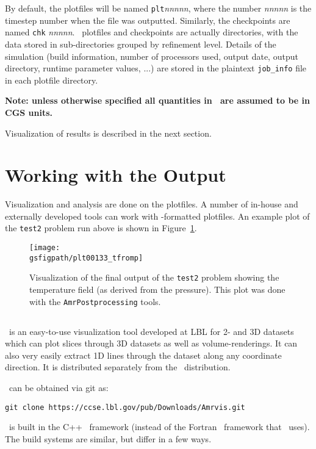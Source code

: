 \begin{enumerate}
By default, the plotfiles will be named {\tt plt}{\em nnnnn}, where
the number {\em nnnnn} is the timestep number when the file was
outputted.  Similarly, the checkpoints are named {\tt chk}{\em
nnnnn}.  \boxlib\ plotfiles and checkpoints are actually directories,
with the data stored in sub-directories grouped by refinement level.
Details of the simulation (build information, number of processors
used, output date, output directory, runtime parameter values, ...)
are stored in the plaintext {\tt job\_info} file in each plotfile directory.

{\bf Note: unless otherwise specified all quantities in \maestro\ are
assumed to be in CGS units.}

Visualization of results is described in the next section.


\end{enumerate}


\section{Working with the Output}

Visualization and analysis are done on the plotfiles.  A number of
in-house and externally developed tools can work
with \boxlib-formatted plotfiles.  An example plot of the {\tt test2}
problem run above is shown in Figure~\ref{fig:gettingstarted:test2}.

\begin{figure}[t]
\centering
\texttt{[image: \\gsfigpath/plt00133\_tfromp]}
\caption[Visualization of {\tt test2} output]{\label{fig:gettingstarted:test2} Visualization of the
final output of the {\tt test2} problem showing the temperature
field (as derived from the pressure).  This plot was done with
the {\tt AmrPostprocessing} tools.}
\end{figure}



\subsection{\amrvis}

\amrvis\ is an easy-to-use visualization tool developed at LBL for
2- and 3D datasets which can plot slices through 3D datasets as well
as volume-renderings.  It can also very easily extract 1D lines
through the dataset along any coordinate direction.  It is distributed
separately from the \maestro\ distribution.

\amrvis\ can be obtained via git as:
\begin{verbatim}
git clone https://ccse.lbl.gov/pub/Downloads/Amrvis.git
\end{verbatim}
\amrvis\ is built in the C++ \boxlib\ framework (instead of the Fortran 
\boxlib\ framework that \maestro\ uses).  The build systems are similar,
but differ in a few ways.  

